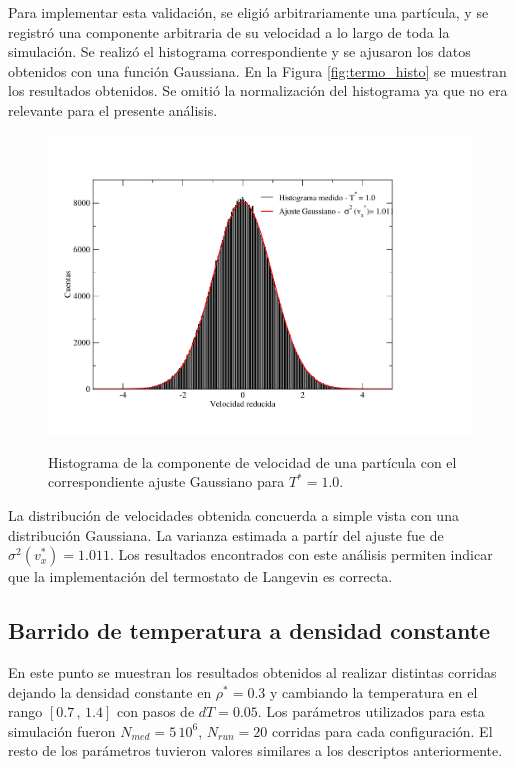 \documentclass[a4paper,12pt]{article}
\begin{document}
Para implementar esta validación, se eligió arbitrariamente una partícula, y se 
registró una componente arbitraria de su velocidad a lo largo de toda la 
simulación. Se realizó el histograma correspondiente y se ajusaron los datos 
obtenidos con una función Gaussiana. En la Figura \eqref{fig:termo_histo} se 
muestran los resultados obtenidos. Se omitió la normalización del histograma ya 
que no era relevante para el presente análisis.

\begin{figure}[H]
  \centering
\includegraphics[scale=0.6]{termo_histograma.pdf} \\
\vspace{-2em}
\caption{Histograma de la componente de velocidad de una partícula con el 
correspondiente ajuste Gaussiano para $T^*=1.0$.}\label{fig:termo_histo}
\end{figure}

La distribución de velocidades obtenida concuerda a simple vista con una 
distribución Gaussiana. La varianza estimada a partír del ajuste fue de 
$\sigma^2(v_x^*) = 1.011$. Los resultados encontrados con este análisis 
permiten indicar que la implementación del termostato de Langevin es correcta.
	

\subsection{Barrido de temperatura a densidad constante}

En este punto se muestran los resultados obtenidos al realizar distintas 
corridas dejando la densidad constante en $\rho^*=0.3$ y cambiando la 
temperatura en el rango $[0.7\, , \, 1.4]$ con pasos de $dT=0.05$. Los 
parámetros utilizados para esta simulación fueron $N_{med} = 5\,10^6$, 
$N_{run} = 20$ corridas para cada configuración. El resto de los parámetros 
tuvieron valores similares a los descriptos anteriormente.
\end{document}
